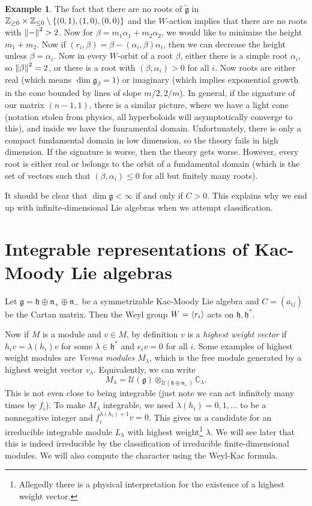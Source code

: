 \documentclass[leqno, openany]{memoir}
\theoremstyle{definition}
\newtheorem{exm}[thm]{Example}
\theoremstyle{remark}
\theoremstyle{plain}
\theoremstyle{definition}
\theoremstyle{remark}
\newcommand{\C}{\mathbb{C}}
\newcommand{\Z}{\mathbb{Z}}
\newcommand{\mc}[1]{\mathcal{#1}}
\newcommand{\mf}[1]{\mathfrak{#1}}
\newcommand{\wtl}[1]{\widetilde{#1}}
\begin{document}
\begin{exm}
    The fact that there are no roots of $\wtl{\mf{g}}$ in $\Z_{\geq 0} \times
\Z_{\leq 0} \setminus \qty{(0,1), (1,0), (0,0)}$ and the $W$-action implies
that there are no roots with $\norm{-}^2 > 2$. Now for $\beta = m_1 \alpha_1 +
m_2 \alpha_2$, we would like to minimize the height $m_1 + m_2$. Now if $(r_i,
\beta) = \beta - (\alpha_i, \beta) \alpha_i$, then we can decrease the height
unless $\beta = \alpha_i$. Now in every $W$-orbit of a root $\beta$, either
there is a simple root $\alpha_i$, so $\norm{\beta}^2 = 2$, or there is a root
with $(\beta, \alpha_i) > 0$ for all $i$. Now roots are either real (which
means $\dim \mf{g}_{\beta} = 1$) or imaginary (which implies exponential growth
in the cone bounded by lines of slope $m/2, 2/m$). In general, if the signature
of our matrix $(n-1,1)$, there is a similar picture, where we have a light cone
(notation stolen from physics, all hyperboloids will asymptotically converge to
this), and inside we have the funramental domain. Unfortunately, there is only
a compact fundamental domain in low dimension, so the theory fails in high
dimension. If the signature is worse, then the theory gets worse. However,
every root is either real or belongs to the orbit of a fundamental domain
(which is the set of vectors such that $(\beta, \alpha_i) \leq 0$ for all but
finitely many roots).  \end{exm}

It should be clear that $\dim \mf{g} < \infty$ if and only if $C > 0$. This
explains why we end up with infinite-dimensional Lie algebras when we attempt
classification.

\section{Integrable representations of Kac-Moody Lie algebras}%
\label{sec:integrable_representations_of_kac_moody_lie_algebras}

Let $\mf{g} = \mf{h} \oplus \mf{n}_+ \oplus \mf{n}_-$ be a symmetrizable
Kac-Moody Lie algebra and $C = (a_{ij})$ be the Cartan matrix. Then the Weyl
group $W = \ev{r_i}$ acts on $\mf{h}, \mf{h}^*$.

Now if $M$ is a module and $v \in M$, by definition $v$ is a \textit{highest
weight vector} if $h_i v = \lambda(h_i) v$ for some $\lambda \in \mf{h}^*$ and
$e_i v = 0$ for all $i$. Some examples of highest weight modules are
\textit{Verma modules} $M_{\lambda}$, which is the free module generated by a
highest weight vector $v_{\lambda}$. Equivalently, we can write \[ M_{\lambda}
= \mc{U}(\mf{g}) \otimes_{\mc{U}(\mf{h} \oplus \mf{n}_+)} \C_{\lambda}. \] This
is not even close to being integrable (just note we can act infinitely many
times by $f_i$). To make $M_{\lambda}$ integrable, we need $\lambda(h_i) =
0,1,\ldots$ to be a nonnegative integer and $f_i^{\lambda(h_i)+1} v = 0$. This
gives us a candidate for an irreducible integrable module $L_{\lambda}$ with
highest weight\footnote{Allegedly there is a physical interpretation for the
existence of a highest weight vector.} $\lambda$. We will see later that this
is indeed irreducible by the classification of irreducible finite-dimensional
modules. We will also compute the character using the Weyl-Kac formula.
\end{document}
